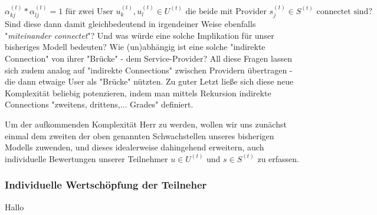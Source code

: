 \begin{equation*}
  \alpha^{(t)}_{kj} * \alpha^{(t)}_{lj} = 1 \textrm{ für zwei User } u^{(t)}_k, u^{(t)}_l \in U^{(t)} \textrm{ die beide mit Provider } s^{(t)}_j \in S^{(t)} \textrm{ connectet sind?}
\end{equation*}
Sind diese dann damit gleichbedeutend in irgendeiner Weise ebenfalls "\textit{miteinander connectet}"? Und was würde eine solche Implikation für unser bisheriges Modell bedeuten? Wie (un)abhängig ist eine solche "indirekte Connection" von ihrer "Brücke" - dem Service-Provider? All diese Fragen lassen sich zudem analog auf "indirekte Connections" zwischen Providern übertragen - die dann etwaige User als "Brücke" nützten. Zu guter Letzt ließe sich diese neue Komplexität beliebig potenzieren, indem man mittels Rekursion indirekte Connections "zweitens, drittens,... Grades" definiert.

Um der aufkommenden Komplexität Herr zu werden, wollen wir uns zunächst einmal dem zweiten der oben genannten Schwachstellen unseres bisherigen Modells zuwenden, und dieses idealerweise dahingehend erweitern, auch individuelle Bewertungen unserer Teilnehmer $u \in U^{(t)}$ und $s \in S^{(t)}$ zu erfassen.


\subsubsection{Individuelle Wertschöpfung der Teilneher}
\label{sec:eco_zahlen_teilnehmer}

Hallo